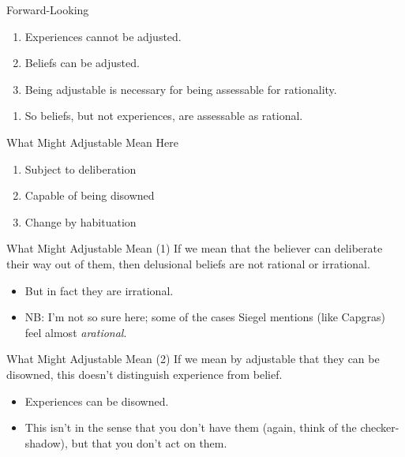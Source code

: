 \documentclass[
  17pt,
  letterpaper,
  ignorenonframetext,
  aspectratio=169,
  xcolor={dvipsnames}]{beamer}
\providecommand{\tightlist}{%
  \setlength{\itemsep}{0pt}\setlength{\parskip}{0pt}}\usepackage{longtable,booktabs,array}
\begin{document}
\begin{frame}{Forward-Looking}
\protect\hypertarget{forward-looking}{}
\begin{enumerate}[<+->]
\tightlist
\item
  Experiences cannot be adjusted.
\item
  Beliefs can be adjusted.
\item
  Being adjustable is necessary for being assessable for rationality.
\end{enumerate}

\begin{enumerate}[<+->]
[A.]
\setcounter{enumi}{2}
\tightlist
\item
  So beliefs, but not experiences, are assessable as rational.
\end{enumerate}
\end{frame}

\begin{frame}{What Might Adjustable Mean Here}
\protect\hypertarget{what-might-adjustable-mean-here}{}
\begin{enumerate}[<+->]
\tightlist
\item
  Subject to deliberation
\item
  Capable of being disowned
\item
  Change by habituation
\end{enumerate}
\end{frame}

\begin{frame}{What Might Adjustable Mean (1)}
\protect\hypertarget{what-might-adjustable-mean-1}{}
If we mean that the believer can deliberate their way out of them, then
delusional beliefs are not rational or irrational.

\begin{itemize}[<+->]
\tightlist
\item
  But in fact they are irrational.
\item
  NB: I'm not so sure here; some of the cases Siegel mentions (like
  Capgras) feel almost \emph{arational}.
\end{itemize}
\end{frame}

\begin{frame}{What Might Adjustable Mean (2)}
\protect\hypertarget{what-might-adjustable-mean-2}{}
If we mean by adjustable that they can be disowned, this doesn't
distinguish experience from belief.

\begin{itemize}[<+->]
\tightlist
\item
  Experiences can be disowned.
\item
  This isn't in the sense that you don't have them (again, think of the
  checker-shadow), but that you don't act on them.
\end{itemize}
\end{frame}
\end{document}
